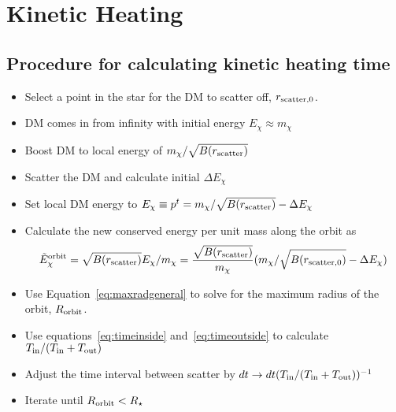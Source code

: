 \chapter{Kinetic Heating}
\label{appendix:kin_heating}


\section{Procedure for calculating kinetic heating time}

\begin{itemize}
    \item Select a point in the star for the DM to scatter off, $r_{\rm scatter, 0}$. 
    \item DM comes in from infinity with initial energy $E_\chi \approx m_\chi$
    \item Boost DM to local energy of $m_\chi/\sqrt{B(r_{\rm scatter})}$
    \item Scatter the DM and calculate initial $\Delta E_\chi$
    \item Set local DM energy to $E_\chi \equiv p^t = m_\chi/\sqrt{B(r_{\rm scatter})} - \Delta E_\chi$
    \item Calculate the new conserved energy per unit mass along the orbit as 
    \begin{equation}
        \tilde E_\chi^{\rm orbit} = \sqrt{B(r_{\rm scatter})}E_\chi/m_\chi = \frac{\sqrt{B(r_{\rm scatter})}}{ m_\chi} (m_\chi/\sqrt{B(r_{\rm scatter, 0})} - \Delta E_\chi)
    \end{equation}
    \item Use Equation~\ref{eq:maxradgeneral} to solve for the maximum radius of the orbit, $R_{\rm orbit}$. 
    \item Use equations~\ref{eq:timeinside} and~\ref{eq:timeoutside} to calculate $T_{\rm in} / (T_{\rm in} + T_{\rm out})$
    \item Adjust the time interval between scatter by $dt\rightarrow dt (T_{\rm in} / (T_{\rm in} + T_{\rm out}))^{-1}$
    \item Iterate until $R_{\rm orbit} < R_\star$
\end{itemize}